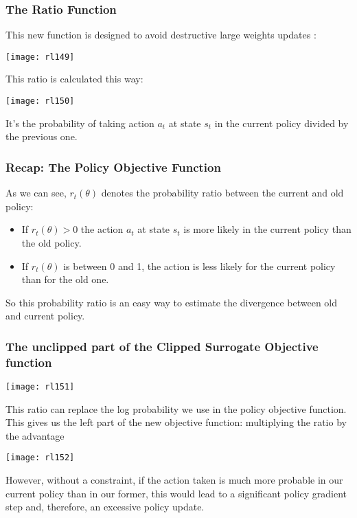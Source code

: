 \begin{frame}[fragile]\frametitle{The Ratio Function}

This new function is designed to avoid destructive large weights updates :

\begin{center}
\texttt{[image: rl149]}
\end{center}



This ratio is calculated this way:

\begin{center}
\texttt{[image: rl150]}
\end{center}

It’s the probability of taking action $a_t$ at state $s_t$ in the current policy divided by the previous one.

\end{frame}


\begin{frame}[fragile]\frametitle{Recap: The Policy Objective Function}

As we can see, $r_t(\theta)$ denotes the probability ratio between the current and old policy:

\begin{itemize}
\item If $r_t(\theta) > 0$ the action $a_t$ at state $s_t$ is more likely in the current policy than the old policy.
\item If $r_t(\theta)$ is between 0 and 1, the action is less likely for the current policy than for the old one.
\end{itemize}

So this probability ratio is an easy way to estimate the divergence between old and current policy.

\end{frame}

\begin{frame}[fragile]\frametitle{The unclipped part of the Clipped Surrogate Objective function}

\begin{center}
\texttt{[image: rl151]}
\end{center}


This ratio can replace the log probability we use in the policy objective function. This gives us the left part of the new objective function: multiplying the ratio by the advantage

\begin{center}
\texttt{[image: rl152]}
\end{center}

However, without a constraint, if the action taken is much more probable in our current policy than in our former, this would lead to a significant policy gradient step and, therefore, an excessive policy update.
\end{frame}

